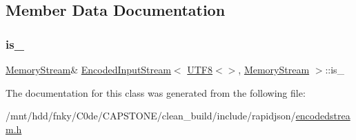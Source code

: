 \subsection{Member Data Documentation}
\mbox{\label{classEncodedInputStream_3_01UTF8_3_4_00_01MemoryStream_01_4_ad5e48564bbd14297a4cc445af3a4aa83}} 
\subsubsection{\texorpdfstring{is\+\_\+}{is\_}}
{\footnotesize\ttfamily \hyperlink{structMemoryStream}{Memory\+Stream}\& \hyperlink{classEncodedInputStream}{Encoded\+Input\+Stream}$<$ \hyperlink{structUTF8}{U\+T\+F8}$<$$>$, \hyperlink{structMemoryStream}{Memory\+Stream} $>$\+::is\+\_\+}



The documentation for this class was generated from the following file\+:\begin{DoxyCompactItemize}
\item 
/mnt/hdd/fnky/\+C0de/\+C\+A\+P\+S\+T\+O\+N\+E/clean\+\_\+build/include/rapidjson/\hyperlink{encodedstream_8h}{encodedstream.\+h}\end{DoxyCompactItemize}
